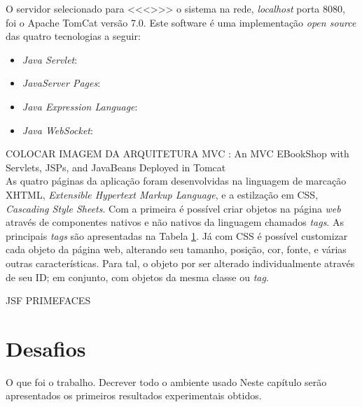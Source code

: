 \indent O servidor selecionado para <<<>>> o sistema na rede, \textit{localhost} porta 8080, foi o Apache TomCat versão 7.0. Este software é uma implementação \textit{open source} das quatro tecnologias \cite{oracle14} a seguir:
\begin{itemize}
	\item \textit{Java Servlet}: 
	\item \textit{JavaServer Pages}:
	\item \textit{Java Expression Language}:
	\item \textit{Java WebSocket}:
\end{itemize}

\indent COLOCAR IMAGEM DA ARQUITETURA MVC : An MVC EBookShop with Servlets, JSPs, and JavaBeans Deployed in Tomcat  \cite{chuan11} \\

\indent As quatro páginas da aplicação foram desenvolvidas na linguagem de marcação XHTML, \textit{Extensible Hypertext Markup Language}, e a estilzação em CSS, \textit{Cascading Style Sheets}. Com a primeira é possível criar objetos na página \textit{web} através de componentes nativos e não nativos da linguagem chamados \textit{tags}. As principais \textit{tags} são apresentadas na Tabela \ref{}. Já com CSS é possível customizar cada objeto da página web, alterando seu tamanho, posição, cor, fonte, e várias outras características. Para tal, o objeto por ser alterado individualmente através de seu ID; em conjunto, com objetos da mesma classe ou \textit{tag}.

\indent 

JSF
PRIMEFACES





\section{Desafios}
 

O que foi o trabalho. 
Decrever todo o ambiente usado
Neste capítulo serão apresentados os primeiros resultados experimentais obtidos.
